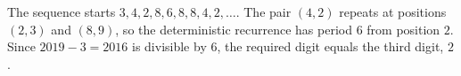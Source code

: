 The sequence starts $3,4,2,8,6,8,8,4,2,\ldots$. The pair $(4,2)$ repeats at positions $(2,3)$ and $(8,9)$, so the deterministic recurrence has period $6$ from position $2$. Since $2019-3=2016$ is divisible by $6$, the required digit equals the third digit, $\boxed2$.
